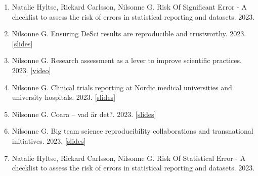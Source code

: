\documentclass[10pt,a4paper,twocolumn]{article}
\begin{document}
\begin{enumerate}
    \item Natalie Hyltse, Rickard Carlsson, Nilsonne G. Risk Of Significant Error - A checklist to assess the risk of errors in statistical reporting and datasets. 2023.

    \item Nilsonne G. Ensuring DeSci results are reproducible and trustworthy. 2023. [\href{https://osf.io/z5amvh}{slides}]

    \item Nilsonne G. Research assessment as a lever to improve scientific practices. 2023. [\href{https://vimeo.com/showcase/10628629/video/862484008}{video}]

    \item Nilsonne G. Clinical trials reporting at Nordic medical universities and university hospitals. 2023. [\href{https://osf.io/z2cyn}{slides}]

    \item Nilsonne G. Coara – vad är det?. 2023. [\href{https://osf.io/2jw5n}{slides}]

    \item Nilsonne G. Big team science reproducibility collaborations and transnational initiatives. 2023. [\href{https://osf.io/b7v3y}{slides}]

    \item Natalie Hyltse, Rickard Carlsson, Nilsonne G. Risk Of Statistical Error - A checklist to assess the risk of errors in statistical reporting and datasets. 2023.

\end{enumerate}


\end{document}
